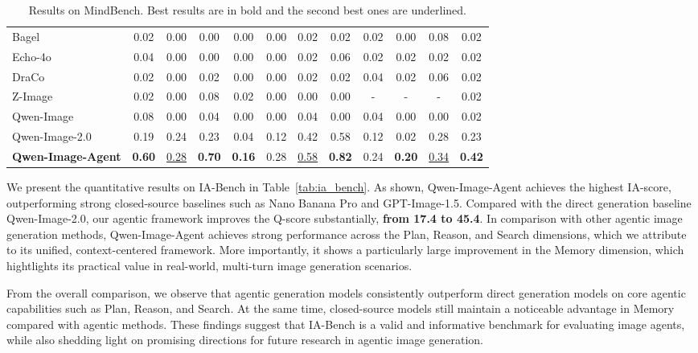 \documentclass{llmxive}
\begin{document}
\begin{table}[t]
{\begin{tabular}{l|ccccc|ccccc|c}
Bagel~\citep{deng2025bagel}                    & 0.02 & 0.00 & 0.00 & 0.00 & 0.00 & 0.02 & 0.02 & 0.02 & 0.00 & 0.08 & 0.02 \\
Echo-4o~\citep{ye2025echo}                     & 0.04 & 0.00 & 0.00 & 0.00 & 0.00 & 0.02 & 0.06 & 0.02 & 0.02 & 0.02 & 0.02 \\
DraCo~\citep{jiang2025draco}                   & 0.02 & 0.00 & 0.02 & 0.00 & 0.00 & 0.02 & 0.02 & 0.04 & 0.02 & 0.06 & 0.02 \\
Z-Image~\citep{cai2025z}                       & 0.02 & 0.00 & 0.08 & 0.02 & 0.00 & 0.00 & 0.00 & - & - & - & 0.02 \\
Qwen-Image~\citep{wu2025qwen}                  & 0.08 & 0.00 & 0.04 & 0.00 & 0.00 & 0.04 & 0.00 & 0.04 & 0.00 & 0.00 & 0.02 \\
Qwen-Image-2.0~\citep{Zhao2026QwenImage20TR}   & 0.19 & 0.24 & 0.23 & 0.04 & 0.12 & 0.42 & 0.58 & 0.12 & 0.02 & 0.28 & 0.23 \\
\midrule
\rowcolor{blue!10}
\textbf{Qwen-Image-Agent} & \textbf{0.60} & \underline{0.28} & \textbf{0.70} & \textbf{0.16} & 0.28 & \underline{0.58} & \textbf{0.82} & 0.24 & \textbf{0.20} & \underline{0.34} & \textbf{0.42} \\
\bottomrule
\end{tabular}
}
\caption{Results on MindBench. Best results are in bold and the second best ones are underlined.}
\label{tab:mindbench}
\end{table}

We present the quantitative results on IA-Bench in Table~\ref{tab:ia_bench}. As shown, Qwen-Image-Agent achieves the highest IA-score, outperforming strong closed-source baselines such as Nano Banana Pro and GPT-Image-1.5. Compared with the direct generation baseline Qwen-Image-2.0, our agentic framework improves the Q-score substantially, \textbf{from 17.4 to 45.4}. In comparison with other agentic image generation methods, Qwen-Image-Agent achieves strong performance across the Plan, Reason, and Search dimensions, which we attribute to its unified, context-centered framework. More importantly, it shows a particularly large improvement in the Memory dimension, which hightlights its practical value in real-world, multi-turn image generation scenarios.

From the overall comparison, we observe that agentic generation models consistently outperform direct generation models on core agentic capabilities such as Plan, Reason, and Search. At the same time, closed-source models still maintain a noticeable advantage in Memory compared with agentic methods. These findings suggest that IA-Bench is a valid and informative benchmark for evaluating image agents, while also shedding light on promising directions for future research in agentic image generation.
\end{document}

